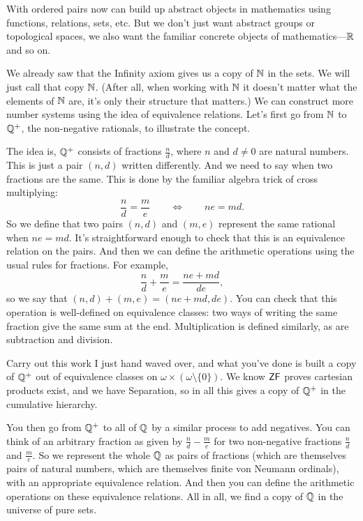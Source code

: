 \documentclass[10pt]{amsart}
\begin{document}
With ordered pairs now can build up abstract objects in mathematics using functions, relations, sets, etc. But we don't just want abstract groups or topological spaces, we also want the familiar concrete objects of mathematics---$\mathbb{R}$ and so on.

We already saw that the Infinity axiom gives us a copy of $\mathbb{N}$ in the sets. We will just call that copy $\mathbb{N}$. (After all, when working with $\mathbb{N}$ it doesn't matter what the elements of $\mathbb{N}$ are, it's only their structure that matters.) We can construct more number systems using the idea of equivalence relations. Let's first go from $\mathbb{N}$ to $\mathbb{Q}^+$, the non-negative rationals, to illustrate the concept.

The idea is, $\mathbb{Q}^+$ consists of fractions $\frac nd$, where $n$ and $d \ne 0$ are natural numbers. This is just a pair $(n,d)$ written differently. And we need to say when two fractions are the same. This is done by the familiar algebra trick of cross multiplying:
\[
\frac nd = \frac me \qquad \iff \qquad ne = md.
\]
So we define that two pairs $(n,d)$ and $(m,e)$ represent the same rational when $ne = md$. It's straightforward enough to check that this is an equivalence relation on the pairs. And then we can define the arithmetic operations using the usual rules for fractions. For example,
\[
\frac  nd + \frac me = \frac{ne + md}{de},
\]
so we say that $(n,d) + (m,e) = (ne + md, de)$. You can check that this operation is well-defined on equivalence classes: two ways of writing the same fraction give the same sum at the end. Multiplication is defined similarly, as are subtraction and division. 

Carry out this work I just hand waved over, and what you've done is built a copy of $\mathbb{Q}^+$ out of equivalence classes on $\omega \times (\omega \setminus \{0\})$. We know $\mathsf{ZF}$ proves cartesian products exist, and we have Separation, so in all this gives a copy of $\mathbb{Q}^+$ in the cumulative hierarchy.

You then go from $\mathbb{Q}^+$ to all of $\mathbb{Q}$ by a similar process to add negatives. You can think of an arbitrary fraction as given by $\frac nd - \frac me$ for two non-negative fractions $\frac nd$ and $\frac me$. So we represent the whole $\mathbb{Q}$ as pairs of fractions (which are themselves pairs of natural numbers, which are themselves finite von Neumann ordinals), with an appropriate equivalence relation. And then you can define the arithmetic operations on these equivalence relations. All in all, we find a copy of $\mathbb{Q}$ in the universe of pure sets.
\end{document}

